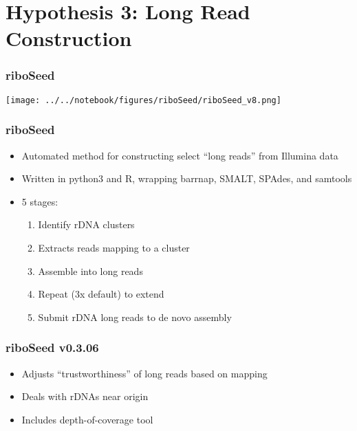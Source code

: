 \documentclass[10pt, compress]{beamer}
\begin{document}
\section{Hypothesis 3: Long Read Construction}


\begin{frame}[fragile]
  \frametitle{riboSeed}
    \texttt{[image: ../../notebook/figures/riboSeed/riboSeed\_v8.png]}\\

\end{frame}


\begin{frame}[fragile]
  \frametitle{riboSeed}
  \begin{itemize}
  \item Automated method for constructing select ``long reads'' from Illumina data
  \item Written in python3 and R, wrapping barrnap, SMALT, SPAdes, and samtools
  \item 5 stages:
  \begin{enumerate}
    \item Identify rDNA clusters
    \item Extracts reads mapping to a cluster
    \item Assemble into long reads
    \item Repeat (3x default) to extend
    \item Submit rDNA long reads to de novo assembly

  \end{enumerate}
  \end{itemize}

\end{frame}

\begin{frame}[fragile]
  \frametitle{riboSeed v0.3.06}
  \begin{itemize}
  \item Adjusts ``trustworthiness'' of long reads based on mapping
  \item Deals with rDNAs near origin
  \item Includes depth-of-coverage tool
  \end{itemize}

\end{frame}
\end{document}
